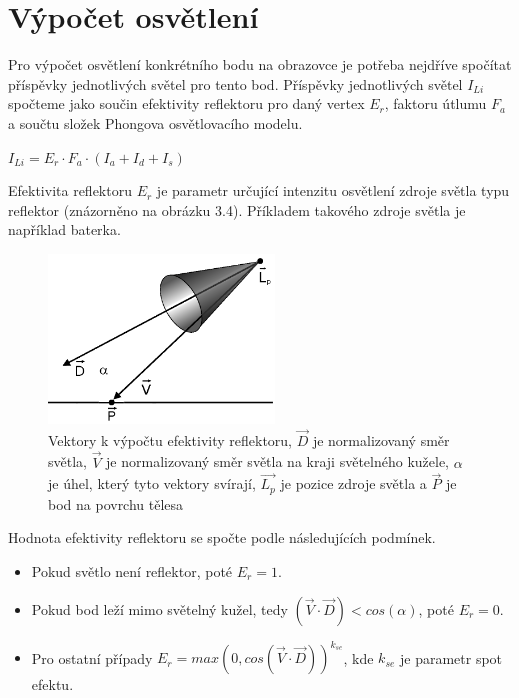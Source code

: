 \documentclass[11pt,twoside,a4paper]{book}
\begin{document}
\section{Výpočet osvětlení}

Pro výpočet osvětlení konkrétního bodu na obrazovce je potřeba nejdříve spočítat příspěvky jednotlivých světel pro tento bod. Příspěvky jednotlivých světel $I_{Li}$ spočteme jako součin efektivity reflektoru pro daný vertex $E_r$, faktoru útlumu $F_a$ a součtu složek Phongova osvětlovacího modelu.
\begin{center}
$I_{Li} = E_r \cdot F_a \cdot (I_a + I_d + I_s)$
\end{center}

Efektivita reflektoru $E_r$ je parametr určující intenzitu osvětlení zdroje světla typu reflektor (znázorněno na obrázku 3.4). Příkladem takového zdroje světla je například baterka.
\newpage

\begin{center}
\begin{figure}[h!]
\includegraphics[width=60mm]{figures/cutoff.png}
\caption{Vektory k výpočtu efektivity reflektoru, $\vec{D}$ je normalizovaný směr světla, $\vec{V}$ je normalizovaný směr světla na kraji světelného kužele, $\alpha$ je úhel, který tyto vektory svírají, $\vec{L_p}$ je pozice zdroje světla a $\vec{P}$ je bod na povrchu tělesa}
\end{figure}
\end{center}

\noindent Hodnota efektivity reflektoru se spočte podle následujících podmínek.
\begin{itemize}
\item Pokud světlo není reflektor, poté $E_r = 1$.
\item Pokud bod leží mimo světelný kužel, tedy $(\vec{V} \cdot \vec{D}) < cos(\alpha)$, poté $E_r = 0$.
\item Pro ostatní případy $E_r = max(0, cos(\vec{V} \cdot \vec{D}))^{k_{se}}$, kde $k_{se}$ je parametr spot efektu.
\end{itemize}
\bigskip
\end{document}
